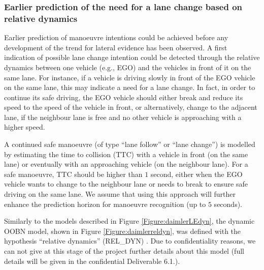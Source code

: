 \subsubsection{Earlier prediction of the need for a lane change based on relative dynamics}

Earlier prediction of manoeuvre intentions could be achieved before any development of the trend for lateral evidence has been observed. A first indication of possible lane change intention could be detected through the relative dynamics between one vehicle (e.g., EGO) and the vehicles in front of it on the same lane. For instance, if a vehicle is driving slowly in front of the EGO vehicle on the same lane, this may indicate a need for a lane change. In fact, in order to continue its safe driving, the EGO vehicle should either break and reduce its speed to the speed of the vehicle in front, or alternatively, change to the adjacent lane, if the neighbour lane is free and no other vehicle is approaching with a higher speed. 

A continued safe manoeuvre (of type ``lane follow'' or ``lane change'') is modelled by estimating the time to collision (TTC) with a vehicle in front (on the same lane) or eventually with an approaching vehicle (on the neighbour lane). For a safe manoeuvre, TTC should be higher than $1$ second, either when the EGO vehicle wants to change to the neighbour lane or needs to break to ensure safe driving on the same lane. We assume that using this approach will further enhance the prediction horizon for manoeuvre recognition (up to $5$ seconds).

Similarly to the models described in Figure \ref{Figure:daimlerLEdyn}, the dynamic OOBN model, shown in Figure \ref{Figure:daimlerreldyn}, was defined with the hypothesis ``relative dynamics'' (REL\_DYN) \cite{SlavaThesis2014}. Due to confidentiality reasons, we can not give at this stage of the project further details about this model (full details will be given in the confidential Deliverable 6.1.).

 
